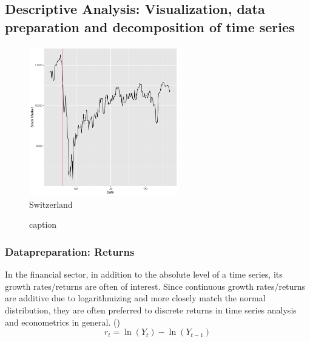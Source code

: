 \documentclass[11pt]{article}
\begin{document}
\subsection{Descriptive Analysis: Visualization, data preparation and decomposition of time series}

\begin{figure}[!htb]
\includegraphics[width=65mm]{R-Code/plots/switzerlandFinance.png} \\
Switzerland
\caption{caption}
\end{figure}




\subsubsection{Datapreparation: Returns}
In the financial sector, in addition to the absolute level of a time series, its growth rates/returns are often of interest.
Since continuous growth rates/returns are additive due to logarithmizing and more closely match the normal distribution, they are often preferred to discrete returns in time series analysis and econometrics in general. (\cite{PowerPoi49:online})
$$r_{t} =\ln \left(Y_{t}\right)-\ln \left(Y_{t-1}\right)$$
\end{document}

